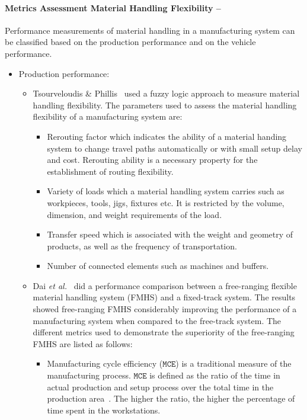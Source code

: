 \paragraph{Metrics Assessment Material Handling Flexibility --}
Performance measurements of material handling in a manufacturing system can be classified based on the production performance and on the vehicle performance.

\begin{itemize}
\item Production performance:
\begin{itemize}
\item Tsourveloudis \& Phillis~\cite{Tsourveloudis.1998} used a fuzzy logic approach to measure material handling flexibility. The parameters used to assess the material handling flexibility of a manufacturing system are:
    \begin{itemize}
    \item Rerouting factor which indicates the ability of a
material handing system to change travel paths automatically
or with small setup delay and cost. Rerouting
ability is a necessary property for the establishment of
routing flexibility.
    \item Variety of loads which a material handling system
carries such as workpieces, tools, jigs, fixtures etc. It
is restricted by the volume, dimension, and weight
requirements of the load.
    \item Transfer speed which is associated with the weight
and geometry of products, as well as the frequency of
transportation.
\item Number of connected elements such as machines
and buffers.
    \end{itemize}
\item Dai \textit{et al.}~\cite{Dai.IJMAT.2009} did a performance comparison between a free-ranging flexible material handling system (FMHS) and a fixed-track system. The results showed free-ranging FMHS considerably improving the performance of a manufacturing system when compared to the free-track system. The different metrics used to demonstrate the superiority of the free-ranging FMHS are listed as follows:
    \begin{itemize}
    \item Manufacturing cycle efficiency ($\mathtt{MCE}$) is a traditional measure of the manufacturing process. $\mathtt{MCE}$ is defined as the ratio of the time in actual production and setup process over the total time in the production area~\cite{Fogarty.1992}. The higher the ratio, the higher the percentage of time spent in the workstations.

\end{itemize}
\end{itemize}
\end{itemize}
